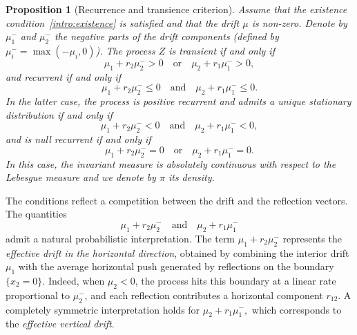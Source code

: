\documentclass[11pt]{article}
\newtheorem{prop}[thm]{Proposition}
\theoremstyle{definition}
\newtheorem{remarque}[thm]{Remark}
\begin{document}
\begin{prop}[Recurrence and transience criterion]%
Assume that the existence condition~\eqref{intro:existence} is satisfied and that the drift $\mu$ is non-zero.
Denote by $\mu_1^{-}$ and $\mu_2^{-}$ the negative parts of the drift components (defined by $\mu_i^-=\max(-\mu_i,0)$). 
The process $Z$ is transient if and only if
\begin{equation}
\mu_1 + r_{2}\mu_2^{-} > 0 
\quad \text{or} \quad 
\mu_2 + r_{1}\mu_1^{-} > 0,
\label{u11}
\end{equation}
and recurrent if and only if
\begin{equation}
\mu_1 + r_{2}\mu_2^{-} \le 0 
\quad \text{and} \quad 
\mu_2 + r_{1}\mu_1^{-} \le 0.
\label{v11}
\end{equation}
In the latter case, the process is positive recurrent and admits a unique stationary
distribution if and only if
\begin{equation}
\mu_1 + r_{2}\mu_2^{-} < 0 
\quad \text{and} \quad 
\mu_2 + r_{1}\mu_1^{-} < 0,
\label{v11pos}
\end{equation}
and is null recurrent if and only if
\[
\mu_1 + r_{2}\mu_2^{-} = 0 
\quad \text{or} \quad 
\mu_2 + r_{1}\mu_1^{-} = 0.
\]
In this case, the invariant measure is absolutely continuous with respect to the Lebesgue measure and we denote by $\pi$ its density.
\end{prop}



The conditions reflect a competition between the drift and the reflection vectors.
The quantities
\[
\mu_1 + r_{2}\mu_2^- 
\quad \text{and} \quad 
\mu_2 + r_{1}\mu_1^-
\]
admit a natural probabilistic interpretation. The term
$
\mu_1 + r_{2}\mu_2^-
$
represents the \emph{effective drift in the horizontal direction}, obtained by combining the interior drift $\mu_1$ with the average horizontal push generated by reflections on the boundary $\{x_2=0\}$. Indeed, when $\mu_2<0$, the process hits this boundary at a linear rate proportional to $\mu_2^-$, and each reflection contributes a horizontal component $r_{12}$. A completely symmetric interpretation holds for
$
\mu_2 + r_{1}\mu_1^-,
$
which corresponds to the \emph{effective vertical drift}.
\end{document}
